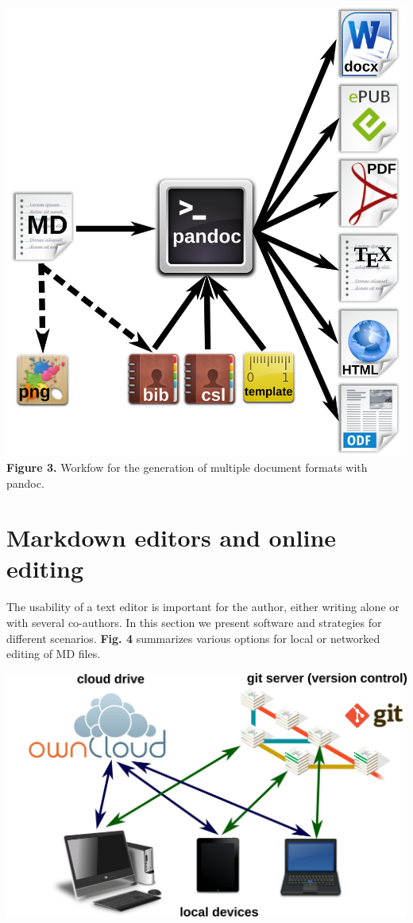 \documentclass[10pt,fleqn]{wlpeerj}
\begin{document}
\includegraphics{fig-pandoc-workflow.png}
\textbf{Figure
3.}
Workfow
for
the
generation
of
multiple
document
formats
with
pandoc.

\section{Markdown
editors
and
online
editing}\label{markdown-editors-and-online-editing}

The
usability
of a
text
editor
is
important
for
the
author,
either
writing
alone
or
with
several
co-authors.
In
this
section
we
present
software
and
strategies
for
different
scenarios.
\textbf{Fig.
4}
summarizes
various
options
for
local
or
networked
editing
of MD
files.

\includegraphics{fig-editing-options.png}
\end{document}
